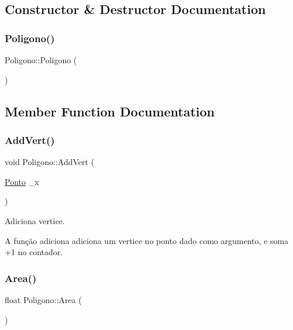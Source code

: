 \subsection{Constructor \& Destructor Documentation}
\mbox{\label{class_poligono_a9311a9a1496878c09c8508b3636e2870}} 
\subsubsection{\texorpdfstring{Poligono()}{Poligono()}}
{\footnotesize\ttfamily Poligono\+::\+Poligono (\begin{DoxyParamCaption}{ }\end{DoxyParamCaption})}



\subsection{Member Function Documentation}
\mbox{\label{class_poligono_ae1be40b54bc95099e1296e156b246881}} 
\subsubsection{\texorpdfstring{Add\+Vert()}{AddVert()}}
{\footnotesize\ttfamily void Poligono\+::\+Add\+Vert (\begin{DoxyParamCaption}\item[{\mbox{\hyperlink{class_ponto}{Ponto}}}]{\+\_\+x }\end{DoxyParamCaption})}



Adiciona vertice. 

A função adiciona adiciona um vertice no ponto dado como argumento, e soma +1 no contador. \mbox{\label{class_poligono_a15cc3e743e4347d966ba12fa2cdb69b7}} 
\subsubsection{\texorpdfstring{Area()}{Area()}}
{\footnotesize\ttfamily float Poligono\+::\+Area (\begin{DoxyParamCaption}{ }\end{DoxyParamCaption})}



